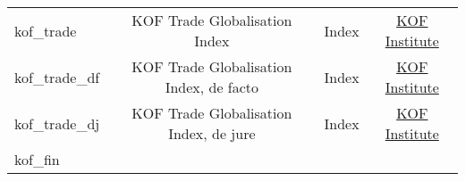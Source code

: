 \documentclass[]{article}
\begin{document}
\begin{longtable}[]{@{}lccc@{}}
\begin{minipage}[t]{0.14\columnwidth}
kof\_trade\strut
\end{minipage} & \begin{minipage}[t]{0.36\columnwidth}\centering\strut
KOF Trade Globalisation Index\strut
\end{minipage} & \begin{minipage}[t]{0.24\columnwidth}\centering\strut
Index\strut
\end{minipage} & \begin{minipage}[t]{0.15\columnwidth}\centering\strut
\href{https://www.kof.ethz.ch/en/forecasts-and-indicators/indicators/kof-globalisation-index.html}{KOF
Institute}\strut
\end{minipage}\tabularnewline
\begin{minipage}[t]{0.14\columnwidth}\raggedright\strut
kof\_trade\_df\strut
\end{minipage} & \begin{minipage}[t]{0.36\columnwidth}\centering\strut
KOF Trade Globalisation Index, de facto\strut
\end{minipage} & \begin{minipage}[t]{0.24\columnwidth}\centering\strut
Index\strut
\end{minipage} & \begin{minipage}[t]{0.15\columnwidth}\centering\strut
\href{https://www.kof.ethz.ch/en/forecasts-and-indicators/indicators/kof-globalisation-index.html}{KOF
Institute}\strut
\end{minipage}\tabularnewline
\begin{minipage}[t]{0.14\columnwidth}\raggedright\strut
kof\_trade\_dj\strut
\end{minipage} & \begin{minipage}[t]{0.36\columnwidth}\centering\strut
KOF Trade Globalisation Index, de jure\strut
\end{minipage} & \begin{minipage}[t]{0.24\columnwidth}\centering\strut
Index\strut
\end{minipage} & \begin{minipage}[t]{0.15\columnwidth}\centering\strut
\href{https://www.kof.ethz.ch/en/forecasts-and-indicators/indicators/kof-globalisation-index.html}{KOF
Institute}\strut
\end{minipage}\tabularnewline
\begin{minipage}[t]{0.14\columnwidth}\raggedright\strut
kof\_fin\strut
\end{minipage} & \begin{minipage}[t]{0.36\columnwidth}\centering\strut

\end{minipage}
\end{longtable}
\end{document}
